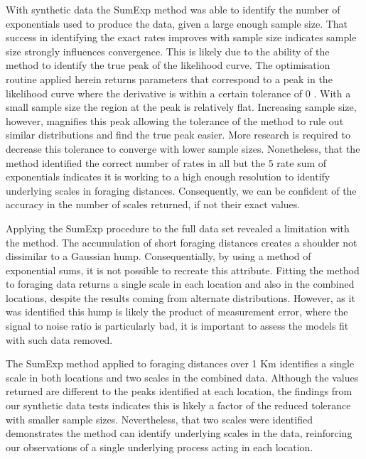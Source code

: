 \documentclass[11pt,usenames,dvipsnames,a4paper]{article}
\begin{document}
\begin{linenumbers}
With synthetic data the SumExp method was able to identify the number of exponentials used to produce the data, given a large enough sample size. That success in identifying the exact rates improves with sample size indicates sample size strongly influences convergence. This is likely due to the ability of the method to identify the true peak of the likelihood curve. The optimisation routine applied herein returns parameters that correspond to a peak in the likelihood curve where the derivative is within a certain tolerance of 0 \citep{Kraft1988}. With a small sample size the region at the peak is relatively flat. Increasing sample size, however, magnifies this peak allowing the tolerance of the method to rule out similar distributions and find the true peak easier. More research is required to decrease this tolerance to converge with lower sample sizes. Nonetheless, that the method identified the correct number of rates in all but the 5 rate sum of exponentials indicates it is working to a high enough resolution to identify underlying scales in foraging distances. Consequently, we can be confident of the accuracy in the number of scales returned, if not their exact values. 

Applying the SumExp procedure to the full data set revealed a limitation with the method. The accumulation of short foraging distances creates a shoulder not dissimilar to a Gaussian hump. Consequentially, by using a method of exponential sums, it is not possible to recreate this attribute. Fitting the method to foraging data returns a single scale in each location and also in the combined locations, despite the results coming from alternate distributions. However, as it was identified this hump is likely the product of measurement error, where the signal to noise ratio is particularly bad, it is important to assess the models fit with such data removed.

The SumExp method applied to foraging distances over 1 Km identifies a single scale in both locations and two scales in the combined data. Although the values returned are different to the peaks identified at each location, the findings from our synthetic data tests indicates this is likely a factor of the reduced tolerance with smaller sample sizes. Nevertheless, that two scales were identified demonstrates the method can identify underlying scales in the data, reinforcing our observations of a single underlying process acting in each location. 


\end{linenumbers}
\end{document}
